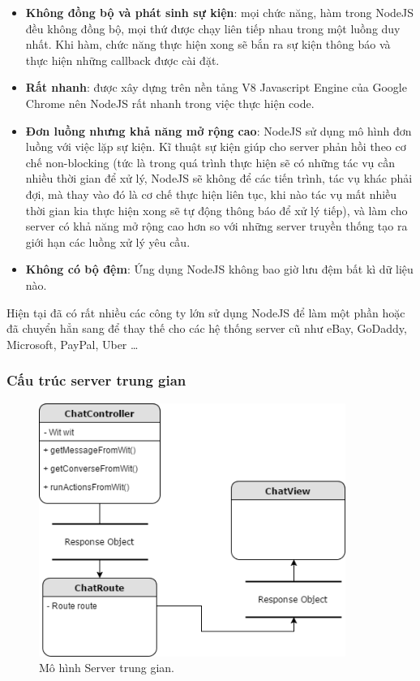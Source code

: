 \documentclass[12pt]{report}
\begin{document}
\begin{itemize}
	\item \textbf{Không đồng bộ và phát sinh sự kiện}: mọi chức năng, hàm trong NodeJS đều không đồng bộ, mọi thứ được chạy liên tiếp nhau trong một luồng duy nhất. Khi hàm, chức năng thực hiện xong sẽ bắn ra sự kiện thông báo và thực hiện những callback được cài đặt.
	\item \textbf{Rất nhanh}: được xây dựng trên nền tảng V8 Javascript Engine của Google Chrome nên NodeJS rất nhanh trong việc thực hiện code.
	\item \textbf{Đơn luồng nhưng khả năng mở rộng cao}: NodeJS sử dụng mô hình đơn luồng với việc lặp sự kiện. Kĩ thuật sự kiện giúp cho server phản hồi theo cơ chế non-blocking (tức là trong quá trình thực hiện sẽ có những tác vụ cần nhiều thời gian để xử lý, NodeJS sẽ không để các tiến trình, tác vụ khác phải đợi, mà thay vào đó là cơ chế thực hiện liên tục, khi nào tác vụ mất nhiều thời gian kia thực hiện xong sẽ tự động thông báo để xử lý tiếp), và làm cho server có khả năng mở rộng cao hơn so với những server truyền thống tạo ra giới hạn các luồng xử lý yêu cầu.
	\item \textbf{Không có bộ đệm}: Ứng dụng NodeJS không bao giờ lưu đệm bất kì dữ liệu nào.
\end{itemize}

Hiện tại đã có rất nhiều các công ty lớn sử dụng NodeJS để làm một phần hoặc đã chuyển hẳn sang để thay thế cho các hệ thống server cũ như eBay, GoDaddy, Microsoft, PayPal, Uber \ldots

\subsubsection{Cấu trúc server trung gian}

\begin{figure}[H]
	\centering
    \includegraphics[width=10cm]{Pics/Chap6/server.png}
  	\caption{Mô hình Server trung gian.}
\end{figure}
\end{document}

